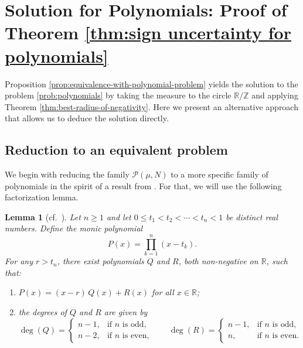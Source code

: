 \documentclass[reqno, a4paper]{amsart}
\def\R{\mathbb{R}}
\def\T{\mathbb{R}/\mathbb{Z}}
\theoremstyle{plain}
\newtheorem{lemma}[theorem]{Lemma}
\theoremstyle{definition}
\theoremstyle{remarkstyle}
\numberwithin{equation}{section}
\begin{document}
\section{Solution for Polynomials: Proof of Theorem \ref{thm:sign uncertainty for polynomials}}\label{sec:solution-for-polynomials}
Proposition \ref{prop:equivalence-with-polynomial-problem} yields the solution to the problem \ref{prob:polynomials} by taking the measure to the circle $\T$ and applying Theorem \ref{thm:best-radius-of-negativity}. Here we present an alternative approach that allows us to deduce the solution directly.
\subsection{Reduction to an equivalent problem}

We begin with reducing the family $\mathcal{P}(\mu, N)$ to a more specific family of polynomials in the spirit of a result from \cite{Carneiro2024SignUncertaintyBrangesSpaces}. For that, we will use the following factorization lemma. 

\begin{lemma}[cf.\ {\cite[Proposition 11]{Carneiro2024SignUncertaintyBrangesSpaces}}]\label{lem:polynomial-reduction}
Let $n \geq 1$ and let $0 \leq t_1 < t_2 < \cdots < t_n < 1$ be distinct real numbers. Define the monic polynomial
\begin{equation*}
    P(x) = \prod_{k=1}^{n}(x - t_k).
\end{equation*}
For any $r > t_n$, there exist polynomials $Q$ and $R$, both non-negative on $\R$, such that:
\begin{enumerate}[label=\textnormal{(\roman*)}]
    \item $P(x) = (x - r)\,Q(x) + R(x)$ for all $x \in \R$;
    \smallskip
    \item the degrees of $Q$ and $R$ are given by
    \begin{equation*}
        \deg(Q) =
        \begin{cases}
            n-1, & \text{if } n \text{ is odd,} \\
            n-2, & \text{if } n \text{ is even,}
        \end{cases}
        \qquad
        \deg(R) =
        \begin{cases}
            n-1, & \text{if } n \text{ is odd,} \\
            n,   & \text{if } n \text{ is even.}
        \end{cases}
    \end{equation*}
\end{enumerate}
\end{lemma}
\end{document}
